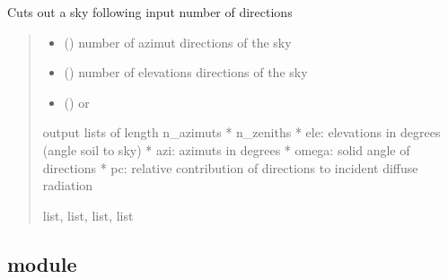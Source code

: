 \documentclass[letterpaper,10pt,english]{sphinxmanual}
\begin{document}
\begin{fulllineitems}
\label{\detokenize{reference:sky.discrete_sky}}
\pysigstartsignatures
{}
\pysigstopsignatures
\sphinxAtStartPar
Cuts out a sky following input number of directions
\begin{quote}\begin{description}
\begin{itemize}
\item {} 
\sphinxAtStartPar
{} () \textendash{} number of azimut directions of the sky

\item {} 
\sphinxAtStartPar
{} () \textendash{} number of elevations directions of the sky

\item {} 
\sphinxAtStartPar
{} () \textendash{}  or 

\end{itemize}

 output lists of length n\_azimuts * n\_zeniths
* ele: elevations in degrees (angle soil to sky)
* azi: azimuts in degrees
* omega: solid angle of directions
* pc: relative contribution of directions to incident diffuse radiation

\sphinxAtStartPar
list, list, list, list

\end{description}\end{quote}

\end{fulllineitems}



\subsection{ module}
\label{\detokenize{reference:module-stems}}\label{\detokenize{reference:stems-module}}
\end{document}
